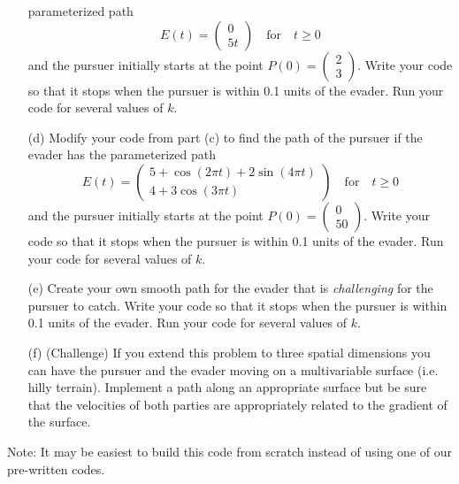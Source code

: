 \begin{problem}
\begin{enumerate}
            parameterized path
            \[ E(t) = \begin{pmatrix} 0 \\ 5t \end{pmatrix} \quad \text{for} \quad t \ge 0 \]
            and the pursuer initially starts at the point $P(0) = \begin{pmatrix}
                2\\3\end{pmatrix}$.  Write your code so that it stops when the pursuer is
            within 0.1 units of the evader.  Run your code for several values of $k$.
        \item[(d)] Modify your code from part (c) to find the path of the pursuer if the
            evader has the parameterized path 
            \[ E(t) = \begin{pmatrix} 5 + \cos(2\pi t) + 2\sin(4\pi t) \\ 4 + 3\cos(3 \pi
                t) \end{pmatrix}  \quad \text{for} \quad t \ge 0 \]
            and the pursuer initially starts at the point $P(0) = \begin{pmatrix} 0 \\ 50
            \end{pmatrix}$.  Write your code so that it stops when the pursuer is
            within 0.1 units of the evader.  Run your code for several values of $k$.
        \item[(e)] Create your own smooth path for the evader that is {\it challenging}
            for the pursuer to catch.  Write your code so that it stops when the pursuer
            is within 0.1 units of the evader.  Run your code for several values of $k$.
        \item[(f)] (Challenge) If you extend this problem to three spatial dimensions you
            can have the pursuer and the evader moving on a multivariable surface (i.e.
            hilly terrain).  Implement a path along an appropriate surface but be sure
            that the velocities of both parties are appropriately related to the gradient
            of the surface.
    \end{enumerate}
    Note: It may be easiest to build this code from scratch instead of using one of our
    pre-written codes.
\end{problem}



